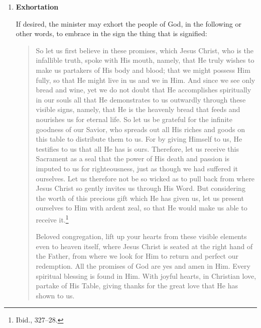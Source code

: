 \documentclass[
]{book}
\begin{document}
\begin{enumerate}
\def\labelenumi{\arabic{enumi}.}
\setcounter{enumi}{4}
\item
  \textbf{Exhortation}

  If desired, the minister may exhort the people of God, in the following or other words, to embrace in the sign the thing that is signified:

  \begin{quote}
  So let us first believe in these promises, which Jesus Christ, who is the infallible truth, spoke with His mouth, namely, that He truly wishes to make us partakers of His body and blood; that we might possess Him fully, so that He might live in us and we in Him. And since we see only bread and wine, yet we do not doubt that He accomplishes spiritually in our souls all that He demonstrates to us outwardly through these visible signs, namely, that He is the heavenly bread that feeds and nourishes us for eternal life. So let us be grateful for the infinite goodness of our Savior, who spreads out all His riches and goods on this table to distribute them to us. For by giving Himself to us, He testifies to us that all He has is ours. Therefore, let us receive this Sacrament as a seal that the power of His death and passion is imputed to us for righteousness, just as though we had suffered it ourselves. Let us therefore not be so wicked as to pull back from where Jesus Christ so gently invites us through His Word. But considering the worth of this precious gift which He has given us, let us present ourselves to Him with ardent zeal, so that He would make us able to receive it.\footnote{Ibid., 327--28.}

  Beloved congregation, lift up your hearts from these visible elements even to heaven itself, where Jesus Christ is seated at the right hand of the Father, from where we look for Him to return and perfect our redemption. All the promises of God are yes and amen in Him. Every spiritual blessing is found in Him. With joyful hearts, in Christian love, partake of His Table, giving thanks for the great love that He has shown to us.
  \end{quote}
\end{enumerate}
\end{document}
